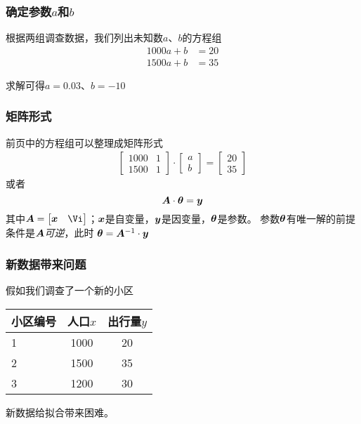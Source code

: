 \documentclass[14pt]{beamer}
\begin{document}
\begin{frame}
    \frametitle{确定参数$a$和$b$}
    根据两组调查数据，我们列出未知数$a$、$b$的方程组
    \begin{align*}
        1000a+b&=20\\
        1500a+b&=35
    \end{align*}

    求解可得$a=0.03$、$b=-10$
\end{frame}

\begin{frame}
    \frametitle{矩阵形式}
    前页中的方程组可以整理成矩阵形式
    \begin{align*}
        \begin{bmatrix}
            1000 & 1\\
            1500 & 1
        \end{bmatrix}\cdot
        \begin{bmatrix}
            a \\
            b
        \end{bmatrix}=
        \begin{bmatrix}
            20\\
            35
        \end{bmatrix}
    \end{align*}
    或者
    \[\bm{A}\cdot \bm{\theta}=\bm{y}\]
    其中$\MA=\begin{bmatrix}
        \Vx & \Vi
    \end{bmatrix}$；$\bm{x}$是自变量，$\bm{y}$是因变量，$\bm{\theta}$是参数。
    参数$\bm{\theta}$有唯一解的前提条件是$\bm{A}$\emph{可逆}，此时
    $\bm{\theta}= \bm{A}^{-1}\cdot\bm{y}$
\end{frame}

\begin{frame}
    \frametitle{新数据带来问题}
    假如我们调查了一个新的小区
    \begin{table}
        \begin{tabular}{l c c}
            小区编号 & 人口$x$ & 出行量$y$ \\
            \hline\hline
            1   & 1000  & 20 \\
            2   & 1500  & 35 \\
            \rowcolor{HRed} 3 & 1200 & 30      
        \end{tabular}
    \end{table}

    新数据给拟合带来困难。
\end{frame}
\end{document}
